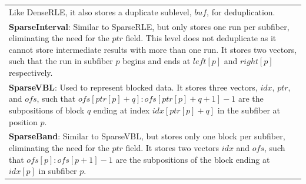 \begin{table}[h]
\begin{tabular}{p{14cm}}
    Like DenseRLE, it also stores a duplicate sublevel, $buf$, for deduplication. \\
    \textbf{SparseInterval}:
    Similar to SparseRLE, but only stores one run per subfiber, eliminating the need for the $ptr$ field.
    This level does not deduplicate as it cannot store intermediate results with more than one run.
    It stores two vectors, such that the run in subfiber $p$ begins and ends at $left[p]$ and $right[p]$ respectively. \\
    \textbf{SparseVBL}: Used to represent blocked data. It stores three vectors, $idx$, $ptr$, and $ofs$, such that $ofs[ptr[p] + q]:ofs[ptr[p] + q + 1] - 1$ are the subpositions of block $q$ ending at index $idx[ptr[p] + q]$ in the subfiber at position $p$. \\
    \textbf{SparseBand}: Similar to SparseVBL, but stores only one block per subfiber, eliminating the need for the $ptr$ field. It stores two vectors $idx$ and $ofs$, such that $ofs[p]:ofs[p + 1] - 1$ are the subpositions of the block ending at $idx[p]$ in subfiber $p$. \\


\end{tabular}
\end{table}
